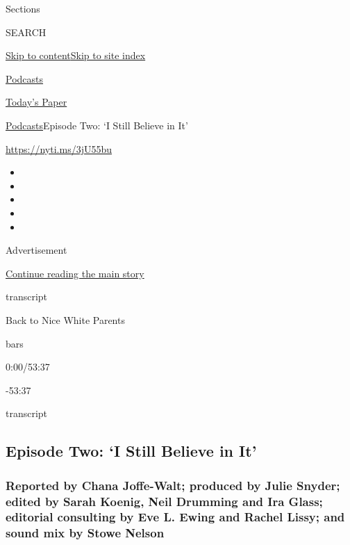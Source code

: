 Sections

SEARCH

\protect\hyperlink{site-content}{Skip to
content}\protect\hyperlink{site-index}{Skip to site index}

\href{https://www.nytimes.com/spotlight/podcasts}{Podcasts}

\href{https://myaccount.nytimes.com/auth/login?response_type=cookie\&client_id=vi}{}

\href{https://www.nytimes.com/section/todayspaper}{Today's Paper}

\href{/spotlight/podcasts}{Podcasts}\textbar{}Episode Two: `I Still
Believe in It'

\url{https://nyti.ms/3jU55bu}

\begin{itemize}
\item
\item
\item
\item
\item
\end{itemize}

Advertisement

\protect\hyperlink{after-top}{Continue reading the main story}

transcript

Back to Nice White Parents

bars

0:00/53:37

-53:37

transcript

\hypertarget{episode-two-i-still-believe-in-it}{%
\subsection{Episode Two: `I Still Believe in
It'}\label{episode-two-i-still-believe-in-it}}

\hypertarget{reported-by-chana-joffe-walt-produced-by-julie-snyder-edited-by-sarah-koenig-neil-drumming-and-ira-glass-editorial-consulting-by-eve-l-ewing-and-rachel-lissy-and-sound-mix-by-stowe-nelson}{%
\subsubsection{Reported by Chana Joffe-Walt; produced by Julie Snyder;
edited by Sarah Koenig, Neil Drumming and Ira Glass; editorial
consulting by Eve L. Ewing and Rachel Lissy; and sound mix by Stowe
Nelson}\label{reported-by-chana-joffe-walt-produced-by-julie-snyder-edited-by-sarah-koenig-neil-drumming-and-ira-glass-editorial-consulting-by-eve-l-ewing-and-rachel-lissy-and-sound-mix-by-stowe-nelson}}

